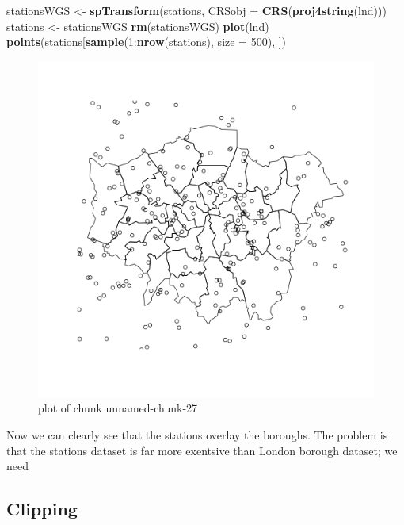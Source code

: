 \documentclass[]{article}
\makeatletter
\newenvironment{Shaded}{}{}
\newcommand{\KeywordTok}[1]{\textcolor[rgb]{0.00,0.44,0.13}{\textbf{{#1}}}}
\newcommand{\DataTypeTok}[1]{\textcolor[rgb]{0.56,0.13,0.00}{{#1}}}
\newcommand{\DecValTok}[1]{\textcolor[rgb]{0.25,0.63,0.44}{{#1}}}
\newcommand{\NormalTok}[1]{{#1}}
\def\maxwidth{\ifdim\Gin@nat@width>\linewidth\linewidth
\else\Gin@nat@width\fi}
\let\Oldincludegraphics\includegraphics
\renewcommand{\includegraphics}[1]{\Oldincludegraphics[width=\maxwidth]{#1}}
\makeatother
\begin{document}
\begin{Shaded}
\begin{Highlighting}[]
\NormalTok{stationsWGS <- }\KeywordTok{spTransform}\NormalTok{(stations, }\DataTypeTok{CRSobj =} \KeywordTok{CRS}\NormalTok{(}\KeywordTok{proj4string}\NormalTok{(lnd)))}
\NormalTok{stations <- stationsWGS}
\KeywordTok{rm}\NormalTok{(stationsWGS)}
\KeywordTok{plot}\NormalTok{(lnd)}
\KeywordTok{points}\NormalTok{(stations[}\KeywordTok{sample}\NormalTok{(}\DecValTok{1}\NormalTok{:}\KeywordTok{nrow}\NormalTok{(stations), }\DataTypeTok{size =} \DecValTok{500}\NormalTok{), ])}
\end{Highlighting}
\end{Shaded}
\begin{figure}[htbp]
\centering
\includegraphics{figure/unnamed-chunk-27.png}
\caption{plot of chunk unnamed-chunk-27}
\end{figure}

Now we can clearly see that the stations overlay the boroughs. The
problem is that the stations dataset is far more exentsive than London
borough dataset; we need

\subsection{Clipping}
\end{document}
